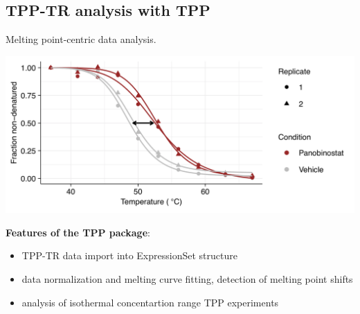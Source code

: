 \documentclass{article}
\newcommand{\hcode}[2][lgray]{{\ttfamily\color{vdgray}\colorbox{#1}{#2}}}
\begin{document}
\begin{multicols}{2}
\begin{minipage}[t]{\linewidth}
  \section*{\huge TPP-TR analysis with \hcode{TPP} \cite{franken_2015}}
  Melting point-centric data analysis.

  \begin{minipage}{0.6\linewidth}
  \includegraphics[width=\linewidth]{figs/tpp-tr_example.png}
  \end{minipage}%
  \begin{minipage}{0.4\linewidth}

  \textbf{Features of the \hcode{TPP} package}:

  \begin{itemize}

  \item TPP-TR data import into ExpressionSet structure
  \item data normalization and melting curve fitting, detection of melting point shifts
  \item analysis of isothermal concentartion range TPP experiments
  
  \end{itemize}
  \end{minipage}


\end{minipage}
\end{multicols}
\end{document}
